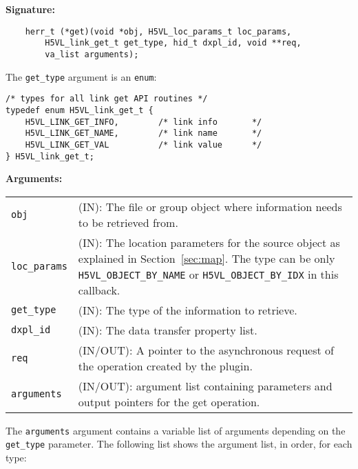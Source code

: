 \begin{mdframed}[style=bgbox]
\textbf{Signature:}
\begin{lstlisting}
    herr_t (*get)(void *obj, H5VL_loc_params_t loc_params, 
        H5VL_link_get_t get_type, hid_t dxpl_id, void **req, 
        va_list arguments);
\end{lstlisting}

The \texttt{get\_type} argument is an \texttt{enum}:
\begin{lstlisting}
/* types for all link get API routines */
typedef enum H5VL_link_get_t {
    H5VL_LINK_GET_INFO,        /* link info       */
    H5VL_LINK_GET_NAME,        /* link name       */
    H5VL_LINK_GET_VAL          /* link value      */
} H5VL_link_get_t;
\end{lstlisting}

\textbf{Arguments:}\\
\begin{tabular}{l p{13.5cm}}
  \texttt{obj} & (IN): The file or group object where information needs to be
  retrieved from.\\
  \texttt{loc\_params} & (IN): The location parameters for the source
  object as explained in Section~\ref{sec:map}. The type can be only \texttt{H5VL\_OBJECT\_BY\_NAME} or \texttt{H5VL\_OBJECT\_BY\_IDX} in this
  callback.\\ 
  \texttt{get\_type} & (IN): The type of the information to retrieve.\\
  \texttt{dxpl\_id} & (IN): The data transfer property list.\\
  \texttt{req} & (IN/OUT): A pointer to the asynchronous request of the
  operation created by the plugin.\\
  \texttt{arguments} & (IN/OUT): argument list containing parameters and
  output pointers for the get operation. \\
\end{tabular}
\end{mdframed}

The \texttt{arguments} argument contains a variable list of arguments
depending on the \texttt{get\_type} parameter. The following list shows
the argument list, in order, for each type:

